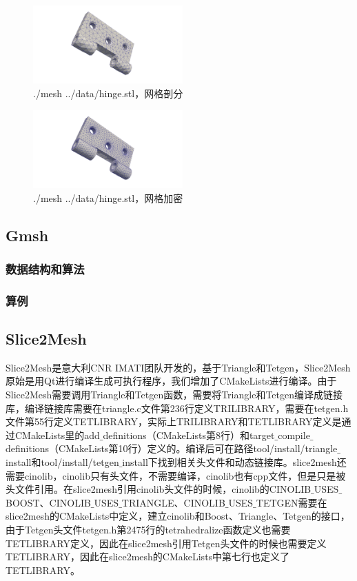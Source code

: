 \begin{figure}[!htbp]
  \centering
  \includegraphics[height=3cm]{fig/1/1.1.4/8.png}
  \caption{./mesh ../data/hinge.stl，网格剖分}
  \label{fig:1-7}
\end{figure}

\begin{figure}[!htbp]
  \centering
  \includegraphics[height=3cm]{fig/1/1.1.4/9.png}
  \caption{./mesh ../data/hinge.stl，网格加密}
  \label{fig:1-7}
\end{figure}

\subsection{Gmsh}

\subsubsection{数据结构和算法}

\subsubsection{算例}

\subsection{Slice2Mesh}

Slice2Mesh是意大利CNR IMATI团队开发的，基于Triangle和Tetgen，Slice2Mesh原始是用Qt进行编译生成可执行程序，我们增加了CMakeLists进行编译。由于Slice2Mesh需要调用Triangle和Tetgen函数，需要将Triangle和Tetgen编译成链接库，编译链接库需要在triangle.c文件第236行定义TRILIBRARY，需要在tetgen.h文件第55行定义TETLIBRARY，实际上TRILIBRARY和TETLIBRARY定义是通过CMakeLists里的add$\_$definitions（CMakeLists第8行）和target$\_$compile$\_$definitions（CMakeLists第10行）定义的。编译后可在路径tool/install/triangle$\_$install和tool/install/tetgen$\_$install下找到相关头文件和动态链接库。slice2mesh还需要cinolib，cinolib只有头文件，不需要编译，cinolib也有cpp文件，但是只是被头文件引用。在slice2mesh引用cinolib头文件的时候，cinolib的CINOLIB$\_$USES$\_$BOOST、CINOLIB$\_$USES$\_$TRIANGLE、CINOLIB$\_$USES$\_$TETGEN需要在slice2mesh的CMakeLists中定义，建立cinolib和Boost、Triangle、Tetgen的接口，由于Tetgen头文件tetgen.h第2475行的tetrahedralize函数定义也需要TETLIBRARY定义，因此在slice2mesh引用Tetgen头文件的时候也需要定义TETLIBRARY，因此在slice2mesh的CMakeLists中第七行也定义了TETLIBRARY。

